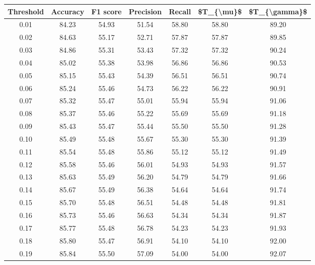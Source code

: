 \begin{tabular}{|c|c|c|c|c|c|c|}
\hline
 Threshold &  Accuracy &  F1 score &  Precision &  Recall &  \$T\_\{\textbackslash mu\}\$ &  \$T\_\{\textbackslash gamma\}\$ \\
\hline
      0.01 &     84.23 &     54.93 &      51.54 &   58.80 &      58.80 &         89.20 \\
      0.02 &     84.63 &     55.17 &      52.71 &   57.87 &      57.87 &         89.85 \\
      0.03 &     84.86 &     55.31 &      53.43 &   57.32 &      57.32 &         90.24 \\
      0.04 &     85.02 &     55.38 &      53.98 &   56.86 &      56.86 &         90.53 \\
      0.05 &     85.15 &     55.43 &      54.39 &   56.51 &      56.51 &         90.74 \\
      0.06 &     85.24 &     55.46 &      54.73 &   56.22 &      56.22 &         90.91 \\
      0.07 &     85.32 &     55.47 &      55.01 &   55.94 &      55.94 &         91.06 \\
      0.08 &     85.37 &     55.46 &      55.22 &   55.69 &      55.69 &         91.18 \\
      0.09 &     85.43 &     55.47 &      55.44 &   55.50 &      55.50 &         91.28 \\
      0.10 &     85.49 &     55.48 &      55.67 &   55.30 &      55.30 &         91.39 \\
      0.11 &     85.54 &     55.48 &      55.86 &   55.12 &      55.12 &         91.49 \\
      0.12 &     85.58 &     55.46 &      56.01 &   54.93 &      54.93 &         91.57 \\
      0.13 &     85.63 &     55.49 &      56.20 &   54.79 &      54.79 &         91.66 \\
      0.14 &     85.67 &     55.49 &      56.38 &   54.64 &      54.64 &         91.74 \\
      0.15 &     85.70 &     55.48 &      56.51 &   54.48 &      54.48 &         91.81 \\
      0.16 &     85.73 &     55.46 &      56.63 &   54.34 &      54.34 &         91.87 \\
      0.17 &     85.77 &     55.48 &      56.78 &   54.23 &      54.23 &         91.93 \\
      0.18 &     85.80 &     55.47 &      56.91 &   54.10 &      54.10 &         92.00 \\
      0.19 &     85.84 &     55.50 &      57.09 &   54.00 &      54.00 &         92.07 \\

\end{tabular}
